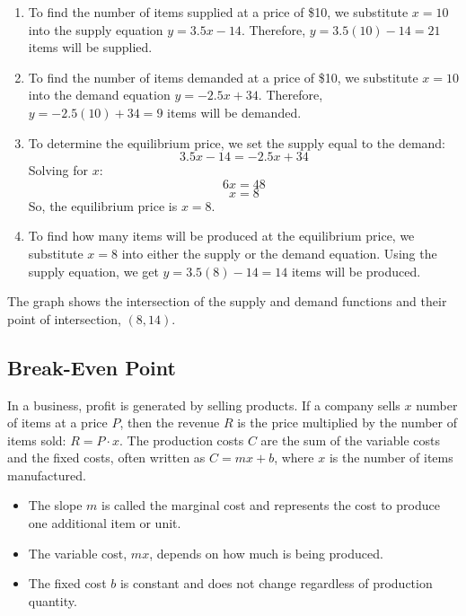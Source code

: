 \begin{solution}
\begin{enumerate}
  \item To find the number of items supplied at a price of \$10, we substitute $x = 10$ into the supply equation $y = 3.5x - 14$. Therefore, $y = 3.5(10) - 14 = 21$ items will be supplied.
  
  \item To find the number of items demanded at a price of \$10, we substitute $x = 10$ into the demand equation $y = -2.5x + 34$. Therefore, $y = -2.5(10) + 34 = 9$ items will be demanded.
  
  \item To determine the equilibrium price, we set the supply equal to the demand:
  \[3.5x - 14 = -2.5x + 34\]
  Solving for $x$:
  \[6x = 48\]
  \[x = 8\]
  So, the equilibrium price is $x = 8$.
  
  \item To find how many items will be produced at the equilibrium price, we substitute $x = 8$ into either the supply or the demand equation. Using the supply equation, we get $y = 3.5(8) - 14 = 14$ items will be produced.
\end{enumerate}

The graph shows the intersection of the supply and demand functions and their point of intersection, $(8, 14)$.
\end{solution}



\subsection{Break-Even Point}

In a business, profit is generated by selling products. If a company sells $x$ number of items at a price $P$, then the revenue $R$ is the price multiplied by the number of items sold: $R = P \cdot x$. The production costs $C$ are the sum of the variable costs and the fixed costs, often written as $C = mx + b$, where $x$ is the number of items manufactured.

\begin{itemize}
  \item The slope $m$ is called the marginal cost and represents the cost to produce one additional item or unit.
  \item The variable cost, $mx$, depends on how much is being produced.
  \item The fixed cost $b$ is constant and does not change regardless of production quantity.
\end{itemize}

